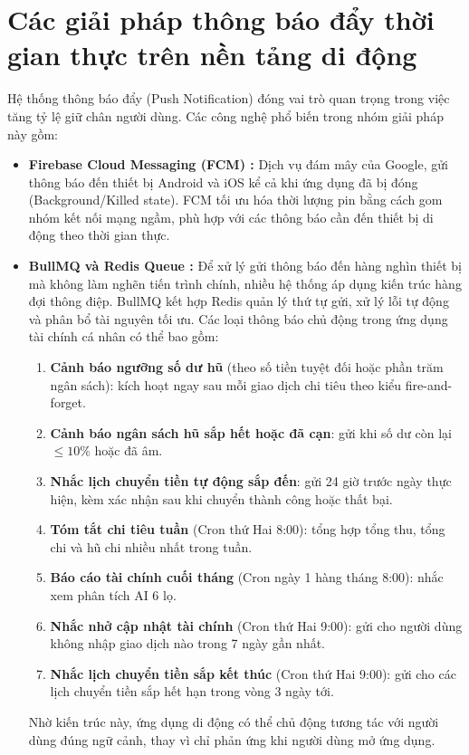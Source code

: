 \section{Các giải pháp thông báo đẩy thời gian thực trên nền tảng di động}
Hệ thống thông báo đẩy (Push Notification) đóng vai trò quan trọng trong việc tăng tỷ lệ giữ chân người dùng. Các công nghệ phổ biến trong nhóm giải pháp này gồm:
\begin{itemize}
    \item \textbf{Firebase Cloud Messaging (FCM) \cite{fcm-docs}:} Dịch vụ đám mây của Google, gửi thông báo đến thiết bị Android và iOS kể cả khi ứng dụng đã bị đóng (Background/Killed state). FCM tối ưu hóa thời lượng pin bằng cách gom nhóm kết nối mạng ngầm, phù hợp với các thông báo cần đến thiết bị di động theo thời gian thực.
    \item \textbf{BullMQ và Redis Queue \cite{bullmq-docs}:} Để xử lý gửi thông báo đến hàng nghìn thiết bị mà không làm nghẽn tiến trình chính, nhiều hệ thống áp dụng kiến trúc hàng đợi thông điệp. BullMQ kết hợp Redis \cite{redis-docs} quản lý thứ tự gửi, xử lý lỗi tự động và phân bổ tài nguyên tối ưu. Các loại thông báo chủ động trong ứng dụng tài chính cá nhân có thể bao gồm:
    \begin{enumerate}
        \item \textbf{Cảnh báo ngưỡng số dư hũ} (theo số tiền tuyệt đối hoặc phần trăm ngân sách): kích hoạt ngay sau mỗi giao dịch chi tiêu theo kiểu fire-and-forget.
        \item \textbf{Cảnh báo ngân sách hũ sắp hết hoặc đã cạn}: gửi khi số dư còn lại $\leq 10\%$ hoặc đã âm.
        \item \textbf{Nhắc lịch chuyển tiền tự động sắp đến}: gửi 24 giờ trước ngày thực hiện, kèm xác nhận sau khi chuyển thành công hoặc thất bại.
        \item \textbf{Tóm tắt chi tiêu tuần} (Cron thứ Hai 8:00): tổng hợp tổng thu, tổng chi và hũ chi nhiều nhất trong tuần.
        \item \textbf{Báo cáo tài chính cuối tháng} (Cron ngày 1 hàng tháng 8:00): nhắc xem phân tích AI 6 lọ.
        \item \textbf{Nhắc nhở cập nhật tài chính} (Cron thứ Hai 9:00): gửi cho người dùng không nhập giao dịch nào trong 7 ngày gần nhất.
        \item \textbf{Nhắc lịch chuyển tiền sắp kết thúc} (Cron thứ Hai 9:00): gửi cho các lịch chuyển tiền sắp hết hạn trong vòng 3 ngày tới.
    \end{enumerate}
    Nhờ kiến trúc này, ứng dụng di động có thể chủ động tương tác với người dùng đúng ngữ cảnh, thay vì chỉ phản ứng khi người dùng mở ứng dụng.
\end{itemize}

